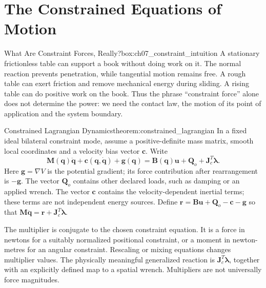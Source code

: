 \section{The Constrained Equations of Motion}
\label{sec:constrained_eom}

\begin{laymansbox}{What Are Constraint Forces, Really?}{box:ch07_constraint_intuition}
A stationary frictionless table can support a book without doing work on it. The normal reaction prevents penetration, while tangential motion remains free. A rough table can exert friction and remove mechanical energy during sliding. A rising table can do positive work on the book. Thus the phrase ``constraint force'' alone does not determine the power: we need the contact law, the motion of its point of application and the system boundary.
\end{laymansbox}

\begin{theorem}{Constrained Lagrangian Dynamics}{theorem:constrained_lagrangian}
In a fixed ideal bilateral constraint mode, assume a positive-definite mass matrix, smooth local coordinates and a velocity bias vector $\bm c$. Write
\begin{equation}
\bm M(\bm q)\ddot{\bm q}+\bm c(\bm q,\dot{\bm q})+\bm g(\bm q)
=\bm B(\bm q)\bm u+\bm Q_o+\bm J_c^T\bm\lambda.
\label{eq:constrained_eom_full}
\end{equation}
Here $\bm g=\nabla V$ is the potential gradient; its force contribution after rearrangement is $-\bm g$. The vector $\bm Q_o$ contains other declared loads, such as damping or an applied wrench. The vector $\bm c$ contains the velocity-dependent inertial terms; these terms are not independent energy sources. Define $\bm r=\bm B\bm u+\bm Q_o-\bm c-\bm g$ so that $\bm M\ddot{\bm q}=\bm r+\bm J_c^T\bm\lambda$.

The multiplier is conjugate to the chosen constraint equation. It is a force in newtons for a suitably normalized positional constraint, or a moment in newton-metres for an angular constraint. Rescaling or mixing equations changes multiplier values. The physically meaningful generalized reaction is $\bm J_c^T\bm\lambda$, together with an explicitly defined map to a spatial wrench. Multipliers are not universally force magnitudes.
\end{theorem}

